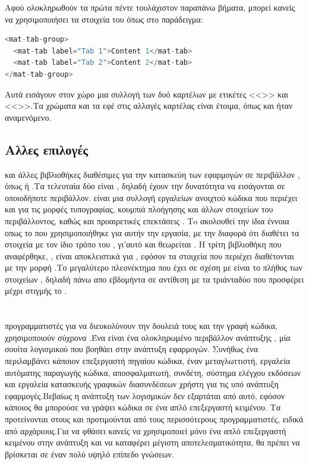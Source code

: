 \quad Αφού ολοκληρωθούν τα πρώτα πέντε τουλάχιστον παραπάνω βήματα, μπορεί κανείς να χρησιμοποιήσει τα στοιχεία του  όπως στο παράδειγμα:
\begin{lstlisting}[language=JAVA]
<mat-tab-group>
  <mat-tab label="Tab 1">Content 1</mat-tab>
  <mat-tab label="Tab 2">Content 2</mat-tab>
</mat-tab-group>
\end{lstlisting}
Αυτά εισάγουν στον χώρο μια συλλογή των δυό καρτέλων με ετικέτες <<>> και <<>>.Τα χρώματα και τα εφέ στις αλλαγές καρτέλας είναι έτοιμα, όπως και ήταν αναμενόμενο.

\subsection*{Αλλες επιλογές}
 και άλλες βιβλιοθήκες διαθέσιμες για την κατασκεύη των εφαρμογών  σε περιβάλλον , όπως  ή .Τα τελευταία δύο είναι , δηλαδή έχουν την δυνατότητα να εισάγονται σε οποιοδήποτε περιβάλλον.\newline
{}  είναι μια συλλογή εργαλείων ανοιχτού κώδικα που περιέχει  και  για τις μορφές τυπογραφίας, κουμπιά πλοήγησης και άλλων στοιχείων του περιβάλλοντος, καθώς και προαιρετικές επεκτάσεις .
Τo  ακολουθεί την ίδια έννοια οπως το  που χρησιμοποιήθηκε για αυτήν την εργασία, με την διαφορά ότι διαθέτει τα στοιχεία με τον ίδιο τρόπο του , γι'αυτό και θεωρείται .
Η τρίτη βιβλιοθήκη που αναφέρθηκε, , είναι αποκλειστικά για , εφόσον τα στοιχεία που περιέχει διαθέτονται με την μορφή .Το μεγαλύτερο πλεονέκτημα που έχει σε σχέση με  είναι το πλήθος των στοιχείων , δηλαδή πάνω απο εβδομήντα σε αντίθεση με τα τριάνταδύο που προσφέρει μέχρι στιγμής το .

\section{}
 προγραμματιστές για να διευκολύνουν την δουλειά τους και την γραφή κώδικα, χρησιμοποιούν σύχρονα .Ένα  είναι ένα ολοκληρωμένο περιβάλλον ανάπτυξης , μία σουίτα λογισμικού που βοηθάει στην ανάπτυξη εφαρμογών. Συνήθως ένα  περιλαμβάνει κάποιον επεξεργαστή πηγαίου κώδικα, έναν μεταγλωττιστή, εργαλεία αυτόματης παραγωγής κώδικα, αποσφαλματωτή, συνδέτη, σύστημα ελέγχου εκδόσεων και εργαλεία κατασκευής γραφικών διασυνδέσεων χρήστη για τις υπό ανάπτυξη εφαρμογές.Βεβαίως η ανάπτυξη των λογισμικών δεν εξαρτάται από αυτό, εφόσον κάποιος θα μπορούσε να γράψει κώδικα σε ένα απλό επεξεργαστή κειμένου. Τα  προτείνονται στους και προτιμούνται από τους περισσότερους προγραμματιστές, ειδικά από αρχάριους.Για να φθάσει κανείς να χρησιμοποιεί μόνο ένα απλό επεξεργαστή κειμένου στην ανάπτυξη και να καταφέρει μέγιστη αποτελεσματικότητα, θα πρέπει να βρίσκεται σε έναν πολύ υψηλό επίπεδο γνώσεων.\newline

